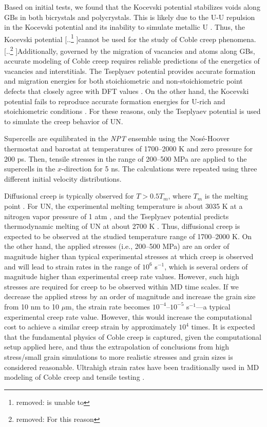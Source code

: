 \documentclass[preprint,12pt,sort&compress]{elsarticle} %
\newcommand{\?}{\stackrel{?}{=}}
\providecommand{\DIFaddtex}[1]{{\sf #1}} %
\providecommand{\DIFdeltex}[1]{{[..\footnote{removed: #1} ]}} %
\providecommand{\DIFaddbegin}{\protect\color{blue}} %
\providecommand{\DIFaddend}{\protect\color{black}} %
\providecommand{\DIFdelbegin}{\protect\color{red}} %
\providecommand{\DIFdelend}{\protect\color{black}} %
\providecommand{\DIFadd}[1]{\texorpdfstring{\DIFaddtex{#1}}{#1}} %
\providecommand{\DIFdel}[1]{\texorpdfstring{\DIFdeltex{#1}}{}} %
\newcommand{\DIFscaledelfig}{0.5}
\newlength{\DIFdelgraphicswidth} %
\newlength{\DIFdelgraphicsheight} %
\newcommand{\DIFaddincludegraphics}[2][]{{\color{blue}\fbox{\DIFOincludegraphics[#1]{#2}}}} %
\newcommand{\DIFdelincludegraphics}[2][]{%
\sbox{\DIFdelgraphicsbox}{\DIFOincludegraphics[#1]{#2}}%
\settoboxwidth{\DIFdelgraphicswidth}{\DIFdelgraphicsbox} %
\settoboxtotalheight{\DIFdelgraphicsheight}{\DIFdelgraphicsbox} %
\scalebox{\DIFscaledelfig}{%
\parbox[b]{\DIFdelgraphicswidth}{\usebox{\DIFdelgraphicsbox}\\[-\baselineskip] \rule{\DIFdelgraphicswidth}{0em}}\llap{\resizebox{\DIFdelgraphicswidth}{\DIFdelgraphicsheight}{%
\setlength{\unitlength}{\DIFdelgraphicswidth}%
\begin{picture}(1,1)%
\thicklines\linethickness{2pt} %
{\color[rgb]{1,0,0}\put(0,0){\framebox(1,1){}}}%
{\color[rgb]{1,0,0}\put(0,0){\line( 1,1){1}}}%
{\color[rgb]{1,0,0}\put(0,1){\line(1,-1){1}}}%
\end{picture}%
}\hspace*{3pt}}} %
} %
\DeclareRobustCommand{\DIFaddbegin}{\DIFOaddbegin \let\includegraphics\DIFaddincludegraphics} %
\DeclareRobustCommand{\DIFaddend}{\DIFOaddend \let\includegraphics\DIFOincludegraphics} %
\DeclareRobustCommand{\DIFdelbegin}{\DIFOdelbegin \let\includegraphics\DIFdelincludegraphics} %
\DeclareRobustCommand{\DIFdelend}{\DIFOaddend \let\includegraphics\DIFOincludegraphics} %
\begin{document}
Based on initial tests, we found that the Kocevski potential stabilizes voids along GBs in both bicrystals and polycrystals. This is likely due to the U-U repulsion in the Kocevski potential and its inability to simulate metallic U \cite{AbdulHameed2024}. Thus, the Kocevski potential \DIFdelbegin \DIFdel{is unable to }\DIFdelend \DIFaddbegin \DIFadd{cannot }\DIFaddend be used for the study of Coble creep phenomena. \DIFdelbegin \DIFdel{For this reason}\DIFdelend \DIFaddbegin \DIFadd{Additionally, governed by the migration of vacancies and atoms along GBs, accurate modeling of Coble creep requires reliable predictions of the energetics of vacancies and interstitials. The Tseplyaev potential provides accurate formation and migration energies for both stoichiometric and non-stoichiometric point defects that closely agree with DFT values \cite{Kuksin2016,Tseplyaev2016,AbdulHameed2024}. On the other hand, the Kocevski potential fails to reproduce accurate formation energies for U-rich and stoichiometric conditions \cite{AbdulHameed2024}. For these reasons}\DIFaddend , only the Tseplyaev potential is used to simulate the creep behavior of UN.
\DIFaddbegin 

\DIFaddend Supercells are equilibrated in the \textit{NPT} ensemble using the Nosé-Hoover thermostat and barostat at temperatures of 1700--2000 K and zero pressure for 200 ps. Then, tensile stresses in the range of 200--500 MPa are applied to the supercells in the $x$-direction for 5 ns. The calculations were repeated using three different initial velocity distributions.

Diffusional creep is typically observed for $T > 0.5 T_m$, where $T_m$ is the melting point \cite{Courtney2005}. For UN, the experimental melting temperature is about 3035 K at a nitrogen vapor pressure of 1 atm \cite{Hayes1990IV}, and the Tseplyaev potential predicts thermodynamic melting of UN at about 2700 K \cite{AbdulHameed2024}. Thus, diffusional creep is expected to be observed at the studied temperature range of 1700--2000 K. On the other hand, the applied stresses (i.e., 200--500 MPa) are an order of magnitude higher than typical experimental stresses at which creep is observed and will lead to strain rates in the range of $10^6$ s$^{-1}$, which is several orders of magnitude higher than experimental creep rate values. However, such high stresses are required for creep to be observed within MD time scales. If we decrease the applied stress by an order of magnitude and increase the grain size from 10 nm to 10 $\mu$m, the strain rate becomes $10^{-4}$--$10^{-5}$ s$^{-1}$---a typical experimental creep rate value. However, this would increase the computational cost to achieve a similar creep strain by approximately $10^4$ times. It is expected that the fundamental physics of Coble creep is captured\DIFaddbegin \DIFadd{, }\DIFaddend given the computational setup applied here, and thus the extrapolation of conclusions from high stress/small grain simulations to more realistic stresses and grain sizes is considered reasonable. \DIFaddbegin \DIFadd{Ultrahigh strain rates have been traditionally used in MD modeling of Coble creep and tensile testing \cite{Keblinski1998,Yamakov2002,Desai2008,Haslam2004,AbdulHameed2024b}.
}\DIFaddend 
\end{document}
